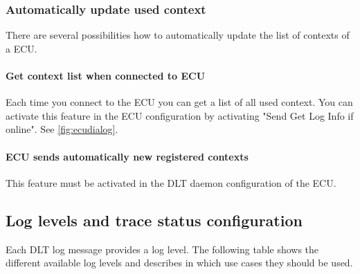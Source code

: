 \documentclass[a4paper,11pt]{article}
\begin{document}
\subsubsection{Automatically update used context}

There are several possibilities how to automatically update the list of contexts of a ECU.

\paragraph{Get context list when connected to ECU}

Each time you connect to the ECU you can get a list of all used context.
You can activate this feature in the ECU configuration by activating "Send Get Log Info if
online". See \autoref{fig:ecudialog}.

\paragraph{ECU sends automatically new registered contexts}

This feature must be activated in the DLT daemon configuration of the ECU.

\pagebreak


\subsection{Log levels and trace status configuration}

\label{loglevels}
Each DLT log message provides a log level. The following table shows the different available
log levels and describes in which use cases they should be used.
\end{document}
